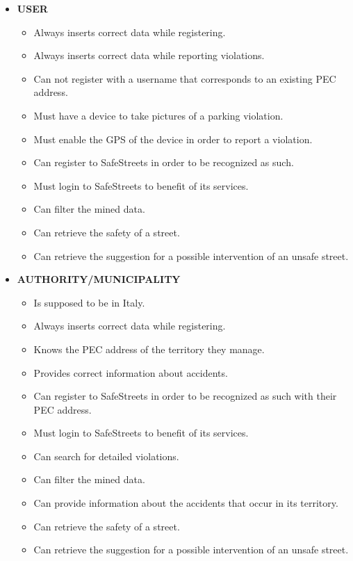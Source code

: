 	\begin{itemize}
		\item \textbf{USER}
			\begin{itemize}
				\item Always inserts correct data while registering.
				\item Always inserts correct data while reporting violations.
				\item Can not register with a username that corresponds to an existing PEC address.
				\item Must have a device to take pictures of a parking violation.
				\item Must enable the GPS of the device in order to report a violation.
				\item Can register to SafeStreets in order to be recognized as such.
				\item Must login to SafeStreets to benefit of its services.
				\item Can filter the mined data.
				\item Can retrieve the safety of a street.
				\item Can retrieve the suggestion for a possible intervention of an unsafe street.
			\end{itemize}
		\item \textbf{AUTHORITY/MUNICIPALITY}
			\begin{itemize}
				\item Is supposed to be in Italy.
				\item Always inserts correct data while registering.
				\item Knows the PEC address of the territory they manage.
				\item Provides correct information about accidents.
				\item Can register to SafeStreets in order to be recognized as such with their PEC address.
				\item Must login to SafeStreets to benefit of its services.
				\item Can search for detailed violations.
				\item Can filter the mined data.
				\item Can provide information about the accidents that occur in its territory.
				\item Can retrieve the safety of a street.
				\item Can retrieve the suggestion for a possible intervention of an unsafe street.
			\end{itemize}
	\end{itemize}
	
